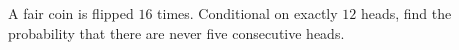 A fair coin is flipped $16$ times. Conditional on exactly $12$ heads, find the probability that there are never five consecutive heads.
